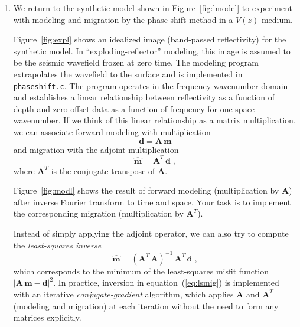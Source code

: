 \begin{enumerate}
\item  We return to the synthetic model shown in Figure~\ref{fig:lmodel} to experiment with  modeling and migration by the phase-shift method in a $V(z)$ medium. 

Figure~\ref{fig:expl} shows an idealized image (band-passed
reflectivity) for the synthetic model. In ``exploding-reflector''
modeling, this image is assumed to be the seismic wavefield frozen at
zero time. The modeling program extrapolates the wavefield to the
surface and is implemented in \texttt{phaseshift.c}. The program
operates in the frequency-wavenumber domain and establishes a linear
relationship between reflectivity as a function of depth and
zero-offset data as a function of frequency for one space wavenumber.
If we think of this linear relationship as a matrix multiplication, we
can associate forward modeling with multiplication\begin{equation}
\label{eq:mod}
\mathbf{d} = \mathbf{A}\,\mathbf{m}
\end{equation}
and migration with the adjoint multiplication
\begin{equation}
\label{eq:mig}
\widehat{\mathbf{m}} = \mathbf{A}^T\,\mathbf{d}\;,
\end{equation}
where $\mathbf{A}^T$ is the conjugate transpose of $\mathbf{A}$.

Figure~\ref{fig:modl} shows the result of forward modeling
(multiplication by $\mathbf{A}$) after inverse Fourier transform to
time and space. Your task is to implement the corresponding migration
(multiplication by $\mathbf{A}^T$). 

Instead of simply applying the adjoint operator, we can also try to compute
the \emph{least-squares inverse}
\begin{equation}
\label{eq:lsmig}
\widehat{\mathbf{m}} = \left(\mathbf{A}^T\,\mathbf{A}\right)^{-1}\,\mathbf{A}^T\,\mathbf{d}\;,
\end{equation}
which corresponds to the minimum of the least-squares misfit function
$|\mathbf{A}\,\mathbf{m}-\mathbf{d}|^2$. In practice, inversion in
equation~(\ref{eq:lsmig}) is implemented with an
iterative \emph{conjugate-gradient} algorithm, which applies
$\mathbf{A}$ and $\mathbf{A}^T$ (modeling and migration) at each
iteration without the need to form any matrices explicitly.




\end{enumerate}
